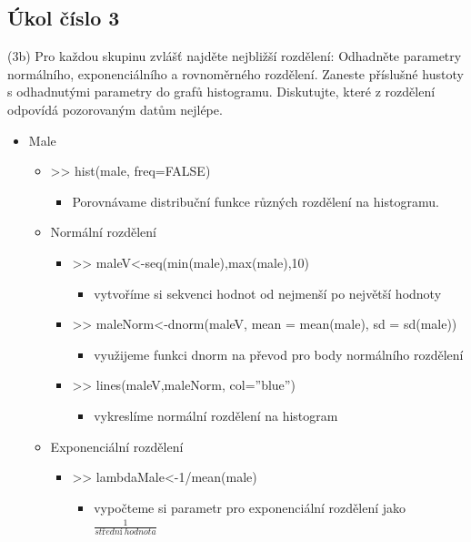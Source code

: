 \documentclass[paper=a4, fontsize=12pt]{scrartcl}
\numberwithin{equation}{section}		%
\numberwithin{figure}{section}			%
\numberwithin{table}{section}				%
\begin{document}
\subsection{Úkol číslo 3}
(3b) Pro každou skupinu zvlášť najděte nejbližší rozdělení: Odhadněte parametry normálního, exponenciálního a rovnoměrného rozdělení. 
Zaneste příslušné hustoty s odhadnutými parametry do grafů histogramu. Diskutujte, které z rozdělení odpovídá pozorovaným datům nejlépe.
\begin{itemize}
	\item Male
		\begin{itemize}
		\item  >> hist(male, freq=FALSE)
		        \begin{itemize}
		        \item Porovnávame distribuční funkce různých rozdělení na histogramu.
		        \end{itemize}
		\item Normální rozdělení
			\begin{itemize}
		        \item >> maleV<-seq(min(male),max(male),10)
		                \begin{itemize}
		                \item vytvoříme si sekvenci hodnot od nejmenší po největší hodnoty 
		                \end{itemize}
		        \item >> maleNorm<-dnorm(maleV, mean = mean(male), sd = sd(male))
		                \begin{itemize}
		                \item využijeme funkci dnorm na převod pro body normálního rozdělení
		                \end{itemize}
		        \item >> lines(maleV,maleNorm, col=''blue'')
		                \begin{itemize}
		                \item vykreslíme normální rozdělení na histogram
		                \end{itemize}
		        \end{itemize}
		\item Exponenciální rozdělení
			\begin{itemize}
		        \item >> lambdaMale<-1/mean(male)
		                \begin{itemize}
		                \item vypočteme si parametr pro exponenciální rozdělení jako $\frac{1}{střední \ hodnota}$

\end{itemize}
\end{itemize}
\end{itemize}
\end{itemize}
\end{document}
